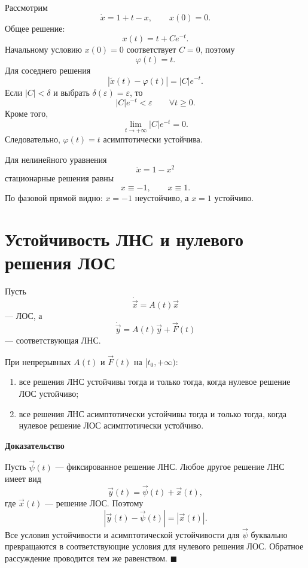 \documentclass[12pt,a4paper]{article}
\numberwithin{equation}{section}
\newcommand{\vect}[1]{\vec{#1}}
\renewenvironment{proof}[1][Доказательство]{\begin{center}\textbf{#1}\end{center}}{\hfill$\blacksquare$\par}
\begin{document}
\begin{exampleHSE}
Рассмотрим
\[
\dot x=1+t-x,
\qquad x(0)=0.
\]
Общее решение:
\[
x(t)=t+Ce^{-t}.
\]
Начальному условию $x(0)=0$ соответствует $C=0$, поэтому
\[
\varphi(t)=t.
\]
Для соседнего решения
\[
|\widetilde x(t)-\varphi(t)|=|C|e^{-t}.
\]
Если $|C|<\delta$ и выбрать $\delta(\varepsilon)=\varepsilon$, то
\[
|C|e^{-t}<\varepsilon
\qquad \forall t\ge0.
\]
Кроме того,
\[
\lim_{t\to+\infty}|C|e^{-t}=0.
\]
Следовательно, $\varphi(t)=t$ асимптотически устойчива.
\end{exampleHSE}

\begin{exampleHSE}
Для нелинейного уравнения
\[
\dot x=1-x^2
\]
стационарные решения равны
\[
x\equiv-1,
\qquad x\equiv1.
\]
По фазовой прямой видно: $x=-1$ неустойчиво, а $x=1$ устойчиво.

\end{exampleHSE}

\section[Устойчивость линейных систем]{Устойчивость ЛНС и нулевого решения ЛОС}

Пусть
\begin{equation}
\dot{\vect{x}}=A(t)\vect{x}
\label{eq:los-stab}
\end{equation}
--- ЛОС, а
\begin{equation}
\dot{\vect{y}}=A(t)\vect{y}+\vect{F}(t)
\label{eq:lns-stab}
\end{equation}
--- соответствующая ЛНС.

\begin{theoremHSE}
При непрерывных $A(t)$ и $\vect{F}(t)$ на $[t_0,+\infty)$:
\begin{enumerate}
  \item все решения ЛНС устойчивы тогда и только тогда, когда нулевое решение ЛОС устойчиво;
  \item все решения ЛНС асимптотически устойчивы тогда и только тогда, когда нулевое решение ЛОС асимптотически устойчиво.
\end{enumerate}
\end{theoremHSE}

\begin{proof}
Пусть $\vect{\psi}(t)$ --- фиксированное решение ЛНС. Любое другое решение ЛНС имеет вид
\[
\vect{y}(t)=\vect{\psi}(t)+\vect{x}(t),
\]
где $\vect{x}(t)$ --- решение ЛОС. Поэтому
\[
|\vect{y}(t)-\vect{\psi}(t)|=|\vect{x}(t)|.
\]
Все условия устойчивости и асимптотической устойчивости для $\vect{\psi}$ буквально превращаются в соответствующие условия для нулевого решения ЛОС. Обратное рассуждение проводится тем же равенством.
\end{proof}
\end{document}
